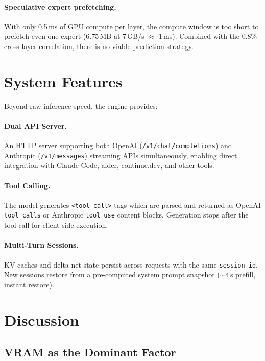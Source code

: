 \documentclass[11pt]{article}
\begin{document}
\paragraph{Speculative expert prefetching.} With only 0.5\,ms of GPU compute per layer, the compute window is too short to prefetch even one expert (6.75\,MB at 7\,GB/s $\approx$ 1\,ms). Combined with the 0.8\% cross-layer correlation, there is no viable prediction strategy.

\section{System Features}

Beyond raw inference speed, the engine provides:

\paragraph{Dual API Server.} An HTTP server supporting both OpenAI (\texttt{/v1/chat/completions}) and Anthropic (\texttt{/v1/messages}) streaming APIs simultaneously, enabling direct integration with Claude Code, aider, continue.dev, and other tools.

\paragraph{Tool Calling.} The model generates \texttt{<tool\_call>} tags which are parsed and returned as OpenAI \texttt{tool\_calls} or Anthropic \texttt{tool\_use} content blocks. Generation stops after the tool call for client-side execution.

\paragraph{Multi-Turn Sessions.} KV caches and delta-net state persist across requests with the same \texttt{session\_id}. New sessions restore from a pre-computed system prompt snapshot ($\sim$4\,s prefill, instant restore).

\section{Discussion}

\subsection{VRAM as the Dominant Factor}
\end{document}
